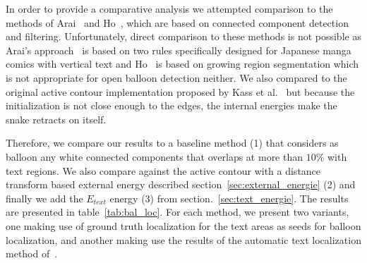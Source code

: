 \documentclass[conference]{IEEEtran}
\begin{document}

In order to provide a comparative analysis we attempted comparison to the methods of Arai~\cite{Arai11} and Ho~\cite{Ho2012}, which are based on connected component detection and filtering. Unfortunately, direct comparison to these methods is not possible as Arai's approach~\cite{Arai11} is based on two rules specifically designed for Japanese manga comics with vertical text and Ho~\cite{Ho2012} is based on growing region segmentation which is not appropriate for open balloon detection neither.
We also compared to the original active contour implementation proposed by Kass et al.~\cite{Kass1988} but because the initialization is not close enough to the edges, the internal energies make the snake retracts on itself.

Therefore, we compare our results to a baseline method (1) that considers as balloon any white connected components that overlaps at more than $10\%$ with text regions. We also compare against the active contour with a distance transform based external energy described section~\ref{sec:external_energie} (2) and finally we add the $E_{text}$ energy (3) from section.~\ref{sec:text_energie}. The results are presented in table~\ref{tab:bal_loc}. For each method, we present two variants, one making use of ground truth localization for the text areas as seeds for balloon localization, and another making use the results of the automatic text localization method of~\cite{Rigaud2013VISAPP}.

\end{document}

